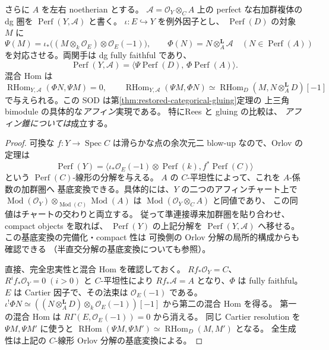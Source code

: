 \begin{theorem}
\label{thm:central-affine-orlov}
さらに $A$ を左右 noetherian とする。
$\mathscr A=\mathcal O_Y\otimes_C A$ 上の perfect な右加群複体の
dg 圏を $\operatorname{Perf}(Y,\mathscr A)$ と書く。
$\iota:E\hookrightarrow Y$ を例外因子とし、
$\operatorname{Perf}(D)$ の対象 $M$ に
\[
 \Psi(M)=\iota_*\bigl((M\otimes_k\mathcal O_E)\otimes\mathcal O_E(-1)\bigr),
 \qquad
 \Phi(N)=N\otimes_A^{\mathbf L}\mathscr A
 \quad(N\in\operatorname{Perf}(A))
\]
を対応させる。両関手は dg fully faithful であり、
\[
\boxed{\quad
\operatorname{Perf}(Y,\mathscr A)
 =\langle\Psi\operatorname{Perf}(D),\,
               \Phi\operatorname{Perf}(A)\rangle.
\quad}
\]
混合 Hom は
\[
 \operatorname{RHom}_{Y,\mathscr A}(\Phi N,\Psi M)=0,
 \qquad
 \operatorname{RHom}_{Y,\mathscr A}(\Psi M,\Phi N)
 \simeq\operatorname{RHom}_{D}
       (M,N\otimes_A^{\mathbf L}D)[-1]
\]
で与えられる。この SOD は第\ref{thm:restored-categorical-gluing}定理の
上三角 bimodule の具体的な\emph{アフィン}実現である。
特にRees と gluing の比較は、
\emph{アフィン錐については}成立する。
\end{theorem}
\begin{proof}
可換な $f:Y\to\operatorname{Spec}C$ は滑らかな点の余次元二 blow-up
なので、Orlov の定理\cite{OrlovBlowup}は
\[
 \operatorname{Perf}(Y)
 =\langle\iota_*\mathcal O_E(-1)\otimes\operatorname{Perf}(k),
                 f^*\operatorname{Perf}(C)\rangle
\]
という $\operatorname{Perf}(C)$-線形の分解を与える。
$A$ の $C$-平坦性によって、これを $A$-係数の加群圏へ
基底変換できる。具体的には、$Y$ の二つのアフィンチャート上で
$\operatorname{Mod}(\mathcal O_Y)\otimes_{\operatorname{Mod}(C)}
\operatorname{Mod}(A)$ は
$\operatorname{Mod}(\mathcal O_Y\otimes_C A)$ と同値であり、
この同値はチャートの交わりと両立する。
従って準連接導来加群圏を貼り合わせ、compact objects を取れば、
$\operatorname{Perf}(Y)$ の上記分解を
$\operatorname{Perf}(Y,\mathscr A)$ へ移せる。
この基底変換の完備化・compact 性は
可換側の Orlov 分解の局所的構成からも確認できる
（半直交分解の基底変換について\cite{KuznetsovSODBaseChange}も参照）。

直接、完全忠実性と混合 Hom を確認しておく。
$Rf_*\mathcal O_Y=C$、$R^if_*\mathcal O_Y=0\;(i>0)$ と
$C$-平坦性により $Rf_*\mathscr A=A$ となり、$\Phi$ は fully faithful。
$E$ は Cartier 因子で、その法束は $\mathcal O_E(-1)$ である。
$\iota^!\Phi N\simeq
 ((N\otimes_A^{\mathbf L}D)\otimes_k\mathcal O_E(-1))[-1]$
から第二の混合 Hom を得る。
第一の混合 Hom は $R\Gamma(E,\mathcal O_E(-1))=0$ から消える。
同じ Cartier resolution を $\Psi M,\Psi M'$ に使うと
$\operatorname{RHom}(\Psi M,\Psi M')\simeq
 \operatorname{RHom}_D(M,M')$ となる。
全生成性は上記の $C$-線形 Orlov 分解の基底変換による。
\end{proof}

